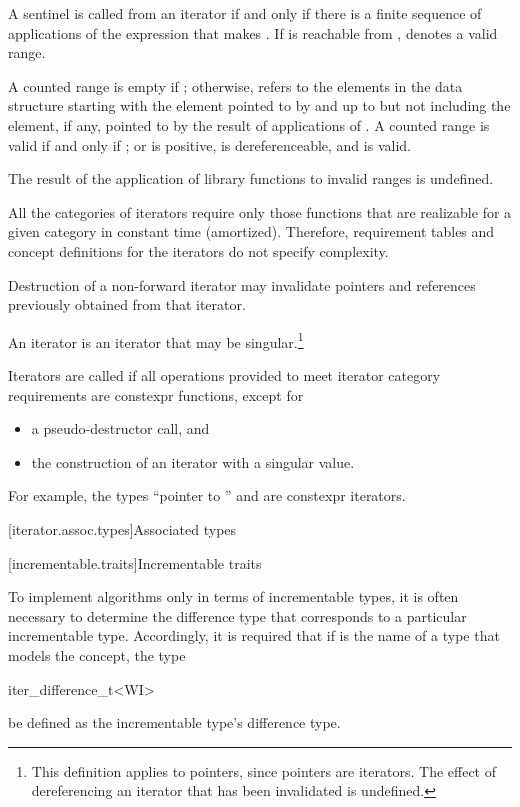 \pnum
A sentinel  is called  from an iterator  if
and only if there is a finite sequence of applications of the expression
 that makes . If  is reachable from ,
 denotes a valid range.

\pnum
A counted range  is empty if ; otherwise, 
refers to the  elements in the data structure starting with the element
pointed to by  and up to but not including the element, if any, pointed to by
the result of  applications of . A counted range
 is valid if and only if ; or  is positive,
 is dereferenceable, and  is valid.

\pnum
The result of the application of library functions
to invalid ranges is undefined.

\pnum
All the categories of iterators require only those functions that are realizable for a given category in
constant time (amortized).
Therefore, requirement tables and concept definitions for the iterators
do not specify complexity.

\pnum
Destruction of a non-forward iterator may invalidate pointers and references
previously obtained from that iterator.

\pnum
An
iterator is an iterator that may be singular.\footnote{This definition applies to pointers, since pointers are iterators.
The effect of dereferencing an iterator that has been invalidated
is undefined.
}

\pnum
{}%
Iterators are called 
if all operations provided to meet iterator category requirements
are constexpr functions, except for
\begin{itemize}
\item a pseudo-destructor call, and
\item the construction of an iterator with a singular value.
\end{itemize}
\begin{note}
For example, the types ``pointer to '' and
 are constexpr iterators.
\end{note}

[iterator.assoc.types]{Associated types}

[incrementable.traits]{Incrementable traits}

\pnum
To implement algorithms only in terms of incrementable types,
it is often necessary to determine the difference type that
corresponds to a particular incrementable type. Accordingly,
it is required that if  is the name of a type that models the
 concept,
the type
\begin{codeblock}
iter_difference_t<WI>
\end{codeblock}
be defined as the incrementable type's difference type.

